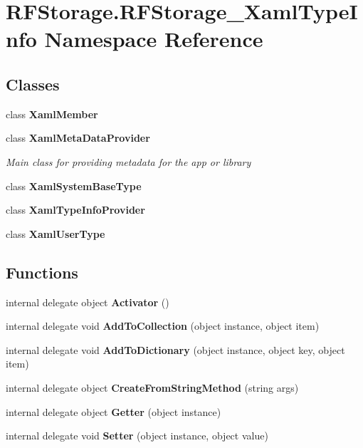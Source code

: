 \section{R\+F\+Storage.\+R\+F\+Storage\+\_\+\+Xaml\+Type\+Info Namespace Reference}
\label{namespace_r_f_storage_1_1_r_f_storage___xaml_type_info}
\subsection*{Classes}
\begin{DoxyCompactItemize}
\item 
class \textbf{ Xaml\+Member}
\item 
class \textbf{ Xaml\+Meta\+Data\+Provider}
\begin{DoxyCompactList}\small\item\em Main class for providing metadata for the app or library \end{DoxyCompactList}\item 
class \textbf{ Xaml\+System\+Base\+Type}
\item 
class \textbf{ Xaml\+Type\+Info\+Provider}
\item 
class \textbf{ Xaml\+User\+Type}
\end{DoxyCompactItemize}
\subsection*{Functions}
\begin{DoxyCompactItemize}
\item 
\mbox{\label{namespace_r_f_storage_1_1_r_f_storage___xaml_type_info_a1c64578423d9df423ab27cdc360ca737}} 
internal delegate object {\bfseries Activator} ()
\item 
\mbox{\label{namespace_r_f_storage_1_1_r_f_storage___xaml_type_info_a7cd70d621107cb8130f46afc3e8c675b}} 
internal delegate void {\bfseries Add\+To\+Collection} (object instance, object item)
\item 
\mbox{\label{namespace_r_f_storage_1_1_r_f_storage___xaml_type_info_a0f6c292d4158659847cec8d41a9cf18c}} 
internal delegate void {\bfseries Add\+To\+Dictionary} (object instance, object key, object item)
\item 
\mbox{\label{namespace_r_f_storage_1_1_r_f_storage___xaml_type_info_a6fecdfab4436d8a78f7f099e24519554}} 
internal delegate object {\bfseries Create\+From\+String\+Method} (string args)
\item 
\mbox{\label{namespace_r_f_storage_1_1_r_f_storage___xaml_type_info_ac1fe63d8bfd7d8d101ba6e66b470f858}} 
internal delegate object {\bfseries Getter} (object instance)
\item 
\mbox{\label{namespace_r_f_storage_1_1_r_f_storage___xaml_type_info_a12376be3734f0959dc596ffa87702e49}} 
internal delegate void {\bfseries Setter} (object instance, object value)
\end{DoxyCompactItemize}
